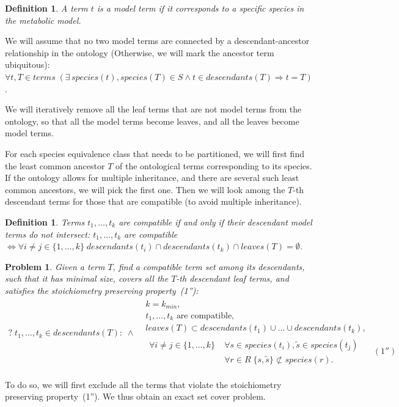 \documentclass[9pt]{article}
\newcounter{pbm}
\newcounter{def}
\newcounter{rm}
\begin{document}
\newtheorem{mt}[def]{Definition}
\begin{mt}
A term $t$ is a \emph{model term} if it corresponds to a specific species in the metabolic model. 
\end{mt}
We will assume that no two model terms are connected by a descendant-ancestor relationship in the ontology (Otherwise, we will mark the ancestor term ubiquitous): \\
$\forall t, T \in terms \; (\exists\, species(t), species(T) \in S \land t \in descendants(T) \Rightarrow t = T)$.

We will iteratively remove all the leaf terms that are not model terms from the ontology, so that all the model terms become leaves, and all the leaves become model terms. 

For each species equivalence class that needs to be partitioned, we will first find the least common ancestor $T$ of the ontological terms corresponding to its species. If the ontology allows for multiple inheritance, and there are several such least common ancestors, we will pick the first one. Then we will look among the $T$-th descendant terms for those that are compatible (to avoid multiple inheritance).

\newtheorem{comp}[def]{Definition}
\begin{comp}
Terms $ t_1, \ldots, t_k$ are \emph{compatible} if and only if their descendant model terms do not intersect:
$ t_1, \ldots, t_k$ are compatible $\iff \forall i \neq j \in \{1, \ldots, k\} \; descendants(t_i) \cap descendants(t_k) \cap leaves(T) = \emptyset$.
\end{comp}

\newtheorem{pp}[pbm]{Problem}
\begin{pp}
Given a term $T$, find a compatible term set among its descendants, such that it has minimal size, covers all the $T$-th descendant leaf terms, and satisfies the stoichiometry preserving property~(1''):
\[ \begin{array}{ll}
\mbox{$?\; t_1, \ldots, t_k \in descendants(T):\; \land $} & \begin{array}{lr}
	\mbox{$k = k_{min}$},&\\
	\mbox{$t_1, \ldots, t_k$ are compatible,} & \\
	\mbox{$leaves(T) \subset descendants(t_1) \cup \ldots \cup descendants(t_k)$},  & \\
	\begin{array}{lr}
	\mbox{$\forall i \neq j \in \{1, \ldots, k\}\;$} & \mbox{$\forall s \in species(t_i), \tilde{s} \in species(t_j)$} \\
	& \mbox{$\forall r \in R \; \{s, \tilde{s}\} \not \subset species(r)$}.
	\end{array} & (1'')
\end{array}
\end{array} \]

\end{pp}
To do so, we will first exclude all the terms that violate the stoichiometry preserving property~(1''). We thus obtain an exact set cover problem.
\end{document}
